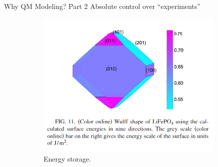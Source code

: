 \documentclass[aspectratio=169]{beamer}
\begin{document}
    \begin{frame}{Why QM Modeling? Part 2}
        Absolute control over “experiments”
        \begin{figure}
            \centering
            \begin{subfigure}{0.4\linewidth}
                \includegraphics[width=\linewidth]{lectures/figures/0.4_LFP_surface.png}
                \caption{Energy storage.\cite{wangFirstprinciplesStudySurface2007}}
            \end{subfigure}
            \begin{subfigure}{0.2\linewidth}

\end{subfigure}
\end{figure}
\end{frame}
\end{document}
